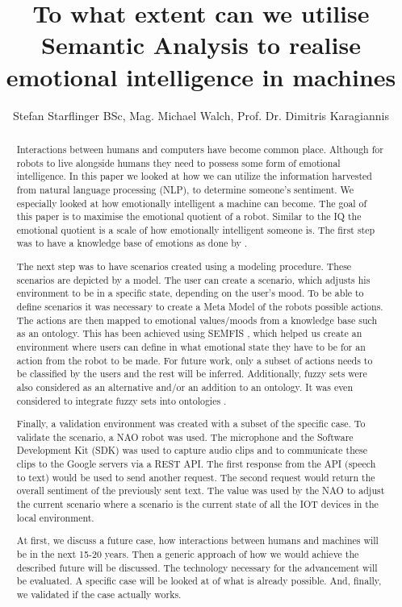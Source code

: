 \documentclass{lncs}
\begin{document}
\title{To what extent can we utilise Semantic Analysis to realise emotional intelligence in machines}
\author{Stefan Starflinger BSc, Mag. Michael Walch, Prof. Dr. Dimitris Karagiannis}

\maketitle
\begin{abstract}
Interactions between humans and computers have become common place. Although for robots to live alongside humans they need to possess some form of emotional intelligence. In this paper we looked at how we can utilize the information harvested from natural language processing (NLP), to determine someone's sentiment. We especially looked at how emotionally intelligent a machine can become. The goal of this paper is to maximise the emotional quotient \cite{colman2015dictionary} of a robot. Similar to the IQ the emotional quotient is a scale of how emotionally intelligent someone is. The first step was to have a knowledge base of emotions as done by \cite{borth2013large}.

The next step was to have scenarios created using a modeling procedure. These scenarios are depicted by a model. The user can create a scenario, which adjusts his environment to be in a specific state, depending on the user's mood. To be able to define scenarios it was necessary to create a Meta Model of the robots possible actions. The actions are then mapped to emotional values/moods from a knowledge base such as an ontology. This has been achieved using SEMFIS \cite{cs3473}, which helped us create an environment where users can define in what emotional state they have to be for an action from the robot to be made. For future work, only a subset of actions needs to be classified by the users and the rest will be inferred. Additionally, fuzzy sets were also considered as an alternative and/or an addition to an ontology. It was even considered to integrate fuzzy sets into ontologies \cite{calegari2006integrating}.

Finally, a validation environment was created with a subset of the specific case. To validate the scenario, a NAO robot was used. The microphone and the Software Development Kit (SDK) was used to capture audio clips and to communicate these clips to the Google servers via a REST API. The first response from the API (speech to text) would be used to send another request. The second request would return the overall sentiment of the previously sent text. The value was used by the NAO to adjust the current scenario where a scenario is the current state of all the IOT devices in the local environment.

At first, we discuss a future case, how interactions between humans and machines will be in the next 15-20 years. Then a generic approach of how we would achieve the described future will be discussed. The technology necessary for the advancement will be evaluated. A specific case will be looked at of what is already possible. And, finally, we validated if the case actually works.
\end{abstract}
\end{document}
